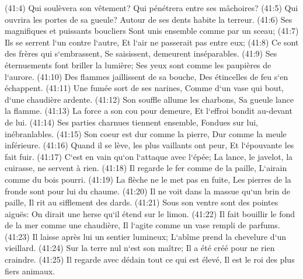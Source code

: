 \verse (41:4) Qui soulèvera son vêtement? Qui pénétrera entre ses mâchoires? 
\verse (41:5) Qui ouvrira les portes de sa gueule? Autour de ses dents habite la terreur. 
\verse (41:6) Ses magnifiques et puissants boucliers Sont unis ensemble comme par un sceau; 
\verse (41:7) Ils se serrent l`un contre l`autre, Et l`air ne passerait pas entre eux; 
\verse (41:8) Ce sont des frères qui s`embrassent, Se saisissent, demeurent inséparables. 
\verse (41:9) Ses éternuements font briller la lumière; Ses yeux sont comme les paupières de l`aurore. 
\verse (41:10) Des flammes jaillissent de sa bouche, Des étincelles de feu s`en échappent. 
\verse (41:11) Une fumée sort de ses narines, Comme d`un vase qui bout, d`une chaudière ardente. 
\verse (41:12) Son souffle allume les charbons, Sa gueule lance la flamme. 
\verse (41:13) La force a son cou pour demeure, Et l`effroi bondit au-devant de lui. 
\verse (41:14) Ses parties charnues tiennent ensemble, Fondues sur lui, inébranlables. 
\verse (41:15) Son coeur est dur comme la pierre, Dur comme la meule inférieure. 
\verse (41:16) Quand il se lève, les plus vaillants ont peur, Et l`épouvante les fait fuir. 
\verse (41:17) C`est en vain qu`on l`attaque avec l`épée; La lance, le javelot, la cuirasse, ne servent à rien. 
\verse (41:18) Il regarde le fer comme de la paille, L`airain comme du bois pourri. 
\verse (41:19) La flèche ne le met pas en fuite, Les pierres de la fronde sont pour lui du chaume. 
\verse (41:20) Il ne voit dans la massue qu`un brin de paille, Il rit au sifflement des dards. 
\verse (41:21) Sous son ventre sont des pointes aiguës: On dirait une herse qu`il étend sur le limon. 
\verse (41:22) Il fait bouillir le fond de la mer comme une chaudière, Il l`agite comme un vase rempli de parfums. 
\verse (41:23) Il laisse après lui un sentier lumineux; L`abîme prend la chevelure d`un vieillard. 
\verse (41:24) Sur la terre nul n`est son maître; Il a été créé pour ne rien craindre. 
\verse (41:25) Il regarde avec dédain tout ce qui est élevé, Il est le roi des plus fiers animaux. 

